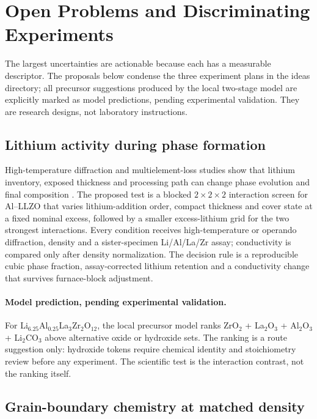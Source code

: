 \section{Open Problems and Discriminating Experiments}
\label{sec:open}

The largest uncertainties are actionable because each has a measurable descriptor. The proposals below condense the three experiment plans in the ideas directory; all precursor suggestions produced by the local two-stage model are explicitly marked as model predictions, pending experimental validation. They are research designs, not laboratory instructions.

\subsection{Lithium activity during phase formation}

High-temperature diffraction and multielement-loss studies show that lithium inventory, exposed thickness and processing path can change phase evolution and final composition \cite{gullbrekken2025phase,montoya2024lithium,moy2025irreversible}. The proposed test is a blocked $2\times2\times2$ interaction screen for Al--LLZO that varies lithium-addition order, compact thickness and cover state at a fixed nominal excess, followed by a smaller excess-lithium grid for the two strongest interactions. Every condition receives high-temperature or operando diffraction, density and a sister-specimen Li/Al/La/Zr assay; conductivity is compared only after density normalization. The decision rule is a reproducible cubic phase fraction, assay-corrected lithium retention and a conductivity change that survives furnace-block adjustment.

\paragraph{Model prediction, pending experimental validation.}
For Li$_{6.25}$Al$_{0.25}$La$_3$Zr$_2$O$_{12}$, the local precursor model ranks ZrO$_2$ + La$_2$O$_3$ + Al$_2$O$_3$ + Li$_2$CO$_3$ above alternative oxide or hydroxide sets. The ranking is a route suggestion only: hydroxide tokens require chemical identity and stoichiometry review before any experiment. The scientific test is the interaction contrast, not the ranking itself.

\subsection{Grain-boundary chemistry at matched density}

